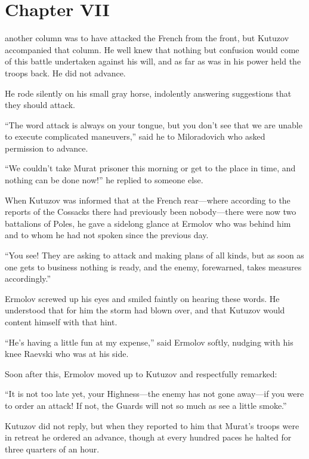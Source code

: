 \chapter*{Chapter VII} \ifaudio {}
\fi

 another column was to have attacked the French from the
front, but Kutuzov accompanied that column. He well knew that
nothing but confusion would come of this battle undertaken
against his will, and as far as was in his power held the troops
back. He did not advance.

He rode silently on his small gray horse, indolently answering
suggestions that they should attack.

``The word attack is always on your tongue, but you don't see
that we are unable to execute complicated maneuvers,'' said he to
Miloradovich who asked permission to advance.

``We couldn't take Murat prisoner this morning or get to the
place in time, and nothing can be done now!'' he replied to
someone else.

When Kutuzov was informed that at the French rear---where
according to the reports of the Cossacks there had previously
been nobody---there were now two battalions of Poles, he gave a
sidelong glance at Ermolov who was behind him and to whom he had
not spoken since the previous day.

``You see! They are asking to attack and making plans of all
kinds, but as soon as one gets to business nothing is ready, and
the enemy, forewarned, takes measures accordingly.''

Ermolov screwed up his eyes and smiled faintly on hearing these
words.  He understood that for him the storm had blown over, and
that Kutuzov would content himself with that hint.

``He's having a little fun at my expense,'' said Ermolov softly,
nudging with his knee Raevski who was at his side.

Soon after this, Ermolov moved up to Kutuzov and respectfully
remarked:

``It is not too late yet, your Highness---the enemy has not gone
away---if you were to order an attack! If not, the Guards will
not so much as see a little smoke.''

Kutuzov did not reply, but when they reported to him that Murat's
troops were in retreat he ordered an advance, though at every
hundred paces he halted for three quarters of an hour.

